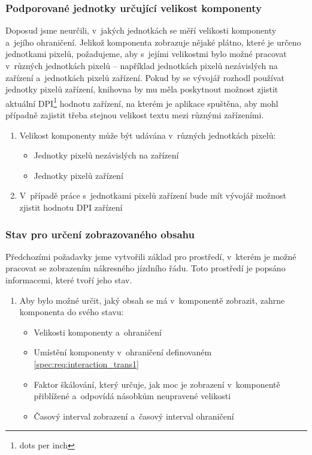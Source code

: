 \subsubsection*{Podporované jednotky určující velikost komponenty}
Doposud jsme neurčili, v~jakých jednotkách se měří velikosti komponenty a~jejího ohraničení. Jelikož komponenta zobrazuje nějaké plátno, které je určeno jednotkami pixelů, požadujeme, aby s~jejími velikostmi bylo možné pracovat v~různých jednotkách pixelů -- například jednotkách pixelů nezávislých na zařízení a~jednotkách pixelů zařízení. Pokud by se vývojář rozhodl používat jednotky pixelů zařízení, knihovna by mu měla poskytnout možnost zjistit aktuální DPI\footnote{dots per inch} hodnotu zařízení, na kterém je aplikace spuštěna, aby mohl případně zajistit třeba stejnou velikost textu mezi různými zařízeními.

\begin{enumerate}[label=\color{reqcolor}\textbf{R{\arabic*}},resume]
	\item \label{spec:req:unit1} Velikost komponenty může být udávána v~různých jednotkách pixelů:
		\begin{itemize}
			\item	Jednotky pixelů nezávislých na zařízení
			\item	Jednotky pixelů zařízení
		\end{itemize} 
	\item \label{spec:req:unit2} V~případě práce s~jednotkami pixelů zařízení bude mít vývojář možnost zjistit hodnotu DPI zařízení  
\end{enumerate}

\subsubsection*{Stav pro určení zobrazovaného obsahu}
Předchozími požadavky jsme vytvořili základ pro prostředí, v~kterém je možné pracovat se zobrazením nákresného jízdního řádu. Toto prostředí je popsáno informacemi, které tvoří jeho stav.

\begin{enumerate}[label=\color{reqcolor}\textbf{R{\arabic*}},resume]
\item \label{spec:req:state} Aby bylo možné určit, jaký obsah se má v~komponentě zobrazit, zahrne komponenta do svého stavu:
	\begin{itemize}
		\item Velikosti komponenty a~ohraničení
		\item Umístění komponenty v~ohraničení definovaném \ref{spec:req:interaction_trans1}
		\item Faktor škálování, který určuje, jak moc je zobrazení v~komponentě přiblížené a~odpovídá násobkům neupravené velikosti
		\item Časový interval zobrazení a~časový interval ohraničení
	\end{itemize}
\end{enumerate}

